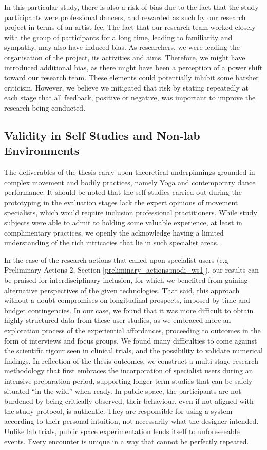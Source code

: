 In this particular study, there is also a risk of bias due to the fact that the study participants were professional dancers, and rewarded as such by our research project in terms of an artist fee. The fact that our research team worked closely with the group of participants for a long time, leading to familiarity and sympathy, may also have induced bias. As researchers, we were leading the organisation of the project, its activities and aims. Therefore, we might have introduced additional bias, as there might have been a perception of a power shift toward our research team. These elements could potentially inhibit some harsher criticism. However, we believe we mitigated that risk by stating repeatedly at each stage that all feedback, positive or negative, was important to improve the research being conducted.

\subsection{Validity in Self Studies and Non-lab Environments}

The deliverables of the thesis carry upon theoretical underpinnings grounded in complex movement and bodily practices, namely Yoga and contemporary dance performance. It should be noted that the self-studies carried out during the prototyping in the evaluation stages lack the expert opinions of movement specialists, which would require inclusion professional practitioners. While study subjects were able to admit to holding some valuable experience, at least in complimentary practices, we openly the acknowledge having a limited understanding of the rich intricacies that lie in such specialist areas.

In the case of the research actions that called upon specialist users (e.g Preliminary Actions 2, Section \ref{preliminary_actions:modi_ws1}), our results can be praised for interdisciplinary inclusion, for which we benefited from gaining alternative perspectives of the given technologies. That said, this approach without a doubt compromises on longitudinal prospects, imposed by time and budget contingencies. In our case, we found that it was more difficult to obtain highly structured data from these user studies, as we embraced more an exploration process of the experiential affordances, proceeding to outcomes in the form of interviews and focus groups. We found many difficulties to come against the scientific rigour seen in clinical trials, and the possibility to validate numerical findings. In reflection of the thesis outcomes, we construct a multi-stage research methodology that first embraces the incorporation of specialist users during an intensive preparation period, supporting longer-term studies that can be safely situated “in-the-wild” when ready. In public space, the participants are not burdened by being critically observed, their behaviour, even if not aligned with the study protocol, is authentic. They are responsible for using a system according to their personal intuition, not necessarily what the designer intended. Unlike lab trials, public space experimentation lends itself to unforeseeable events. Every encounter is unique in a way that cannot be perfectly repeated.

